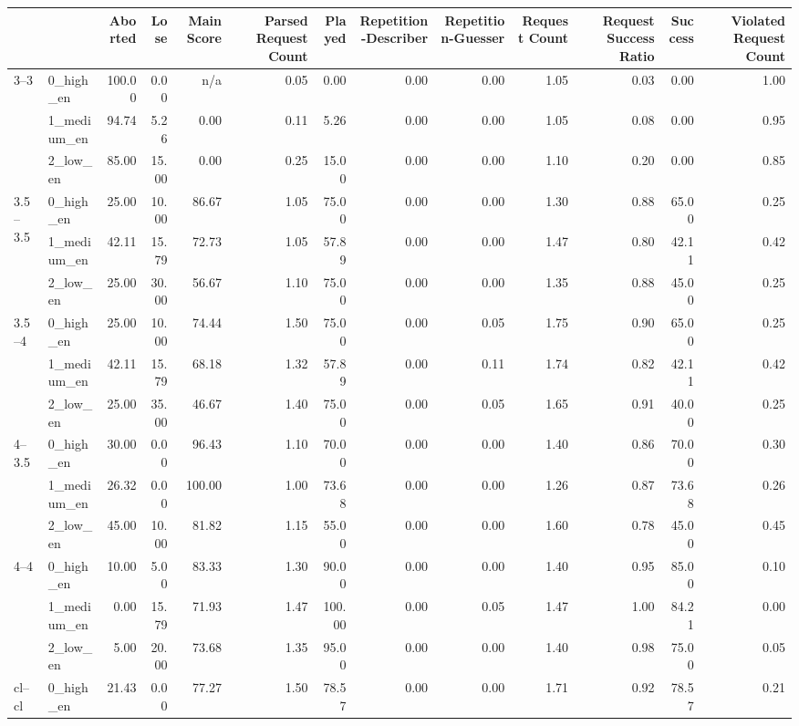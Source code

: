 \begin{tabular}{llrrrrrrrrrrr}
\toprule
 &  & Aborted & Lose & Main Score & Parsed Request Count & Played & Repetition-Describer & Repetition-Guesser & Request Count & Request Success Ratio & Success & Violated Request Count \\
\midrule
\multirow[t]{3}{*}{3--3} & 0_high_en & 100.00 & 0.00 & n/a & 0.05 & 0.00 & 0.00 & 0.00 & 1.05 & 0.03 & 0.00 & 1.00 \\
 & 1_medium_en & 94.74 & 5.26 & 0.00 & 0.11 & 5.26 & 0.00 & 0.00 & 1.05 & 0.08 & 0.00 & 0.95 \\
 & 2_low_en & 85.00 & 15.00 & 0.00 & 0.25 & 15.00 & 0.00 & 0.00 & 1.10 & 0.20 & 0.00 & 0.85 \\
\cline{1-13}
\multirow[t]{3}{*}{3.5--3.5} & 0_high_en & 25.00 & 10.00 & 86.67 & 1.05 & 75.00 & 0.00 & 0.00 & 1.30 & 0.88 & 65.00 & 0.25 \\
 & 1_medium_en & 42.11 & 15.79 & 72.73 & 1.05 & 57.89 & 0.00 & 0.00 & 1.47 & 0.80 & 42.11 & 0.42 \\
 & 2_low_en & 25.00 & 30.00 & 56.67 & 1.10 & 75.00 & 0.00 & 0.00 & 1.35 & 0.88 & 45.00 & 0.25 \\
\cline{1-13}
\multirow[t]{3}{*}{3.5--4} & 0_high_en & 25.00 & 10.00 & 74.44 & 1.50 & 75.00 & 0.00 & 0.05 & 1.75 & 0.90 & 65.00 & 0.25 \\
 & 1_medium_en & 42.11 & 15.79 & 68.18 & 1.32 & 57.89 & 0.00 & 0.11 & 1.74 & 0.82 & 42.11 & 0.42 \\
 & 2_low_en & 25.00 & 35.00 & 46.67 & 1.40 & 75.00 & 0.00 & 0.05 & 1.65 & 0.91 & 40.00 & 0.25 \\
\cline{1-13}
\multirow[t]{3}{*}{4--3.5} & 0_high_en & 30.00 & 0.00 & 96.43 & 1.10 & 70.00 & 0.00 & 0.00 & 1.40 & 0.86 & 70.00 & 0.30 \\
 & 1_medium_en & 26.32 & 0.00 & 100.00 & 1.00 & 73.68 & 0.00 & 0.00 & 1.26 & 0.87 & 73.68 & 0.26 \\
 & 2_low_en & 45.00 & 10.00 & 81.82 & 1.15 & 55.00 & 0.00 & 0.00 & 1.60 & 0.78 & 45.00 & 0.45 \\
\cline{1-13}
\multirow[t]{3}{*}{4--4} & 0_high_en & 10.00 & 5.00 & 83.33 & 1.30 & 90.00 & 0.00 & 0.00 & 1.40 & 0.95 & 85.00 & 0.10 \\
 & 1_medium_en & 0.00 & 15.79 & 71.93 & 1.47 & 100.00 & 0.00 & 0.05 & 1.47 & 1.00 & 84.21 & 0.00 \\
 & 2_low_en & 5.00 & 20.00 & 73.68 & 1.35 & 95.00 & 0.00 & 0.00 & 1.40 & 0.98 & 75.00 & 0.05 \\
\cline{1-13}
\multirow[t]{3}{*}{cl--cl} & 0_high_en & 21.43 & 0.00 & 77.27 & 1.50 & 78.57 & 0.00 & 0.00 & 1.71 & 0.92 & 78.57 & 0.21 \\

\end{tabular}
